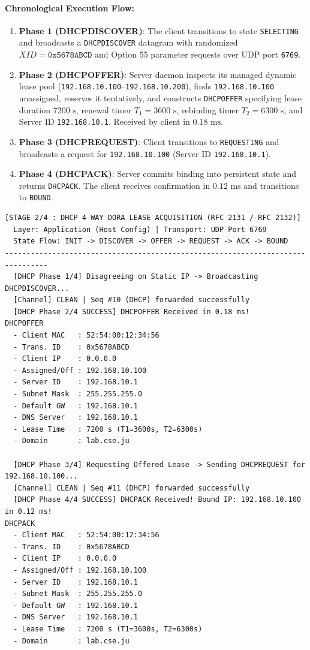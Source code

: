 \documentclass[12pt, a4paper]{article}
\begin{document}
\paragraph{Chronological Execution Flow:}
\begin{enumerate}
    \item \textbf{Phase 1 (DHCPDISCOVER)}: The client transitions to state \texttt{SELECTING} and broadcasts a \texttt{DHCPDISCOVER} datagram with randomized $XID = \texttt{0x5678ABCD}$ and Option 55 parameter requests over UDP port \texttt{6769}.
    \item \textbf{Phase 2 (DHCPOFFER)}: Server daemon inspects its managed dynamic lease pool (\texttt{192.168.10.100}--\texttt{192.168.10.200}), finds \texttt{192.168.10.100} unassigned, reserves it tentatively, and constructs \texttt{DHCPOFFER} specifying lease duration $7200\text{ s}$, renewal timer $T_1 = 3600\text{ s}$, rebinding timer $T_2 = 6300\text{ s}$, and Server ID \texttt{192.168.10.1}. Received by client in $0.18\text{ ms}$.
    \item \textbf{Phase 3 (DHCPREQUEST)}: Client transitions to \texttt{REQUESTING} and broadcasts a request for \texttt{192.168.10.100} (Server ID \texttt{192.168.10.1}).
    \item \textbf{Phase 4 (DHCPACK)}: Server commits binding into persistent state and returns \texttt{DHCPACK}. The client receives confirmation in $0.12\text{ ms}$ and transitions to \texttt{BOUND}.
\end{enumerate}

\begin{lstlisting}[style=termstyle, caption=Authentic Terminal Output: DHCP 4-Way DORA Negotiation Trace]
[STAGE 2/4 : DHCP 4-WAY DORA LEASE ACQUISITION (RFC 2131 / RFC 2132)]
  Layer: Application (Host Config) | Transport: UDP Port 6769
  State Flow: INIT -> DISCOVER -> OFFER -> REQUEST -> ACK -> BOUND
--------------------------------------------------------------------------------
  [DHCP Phase 1/4] Disagreeing on Static IP -> Broadcasting DHCPDISCOVER...
  [Channel] CLEAN | Seq #10 (DHCP) forwarded successfully
  [DHCP Phase 2/4 SUCCESS] DHCPOFFER Received in 0.18 ms!
DHCPOFFER
  - Client MAC   : 52:54:00:12:34:56
  - Trans. ID    : 0x5678ABCD
  - Client IP    : 0.0.0.0
  - Assigned/Off : 192.168.10.100
  - Server ID    : 192.168.10.1
  - Subnet Mask  : 255.255.255.0
  - Default GW   : 192.168.10.1
  - DNS Server   : 192.168.10.1
  - Lease Time   : 7200 s (T1=3600s, T2=6300s)
  - Domain       : lab.cse.ju

  [DHCP Phase 3/4] Requesting Offered Lease -> Sending DHCPREQUEST for 192.168.10.100...
  [Channel] CLEAN | Seq #11 (DHCP) forwarded successfully
  [DHCP Phase 4/4 SUCCESS] DHCPACK Received! Bound IP: 192.168.10.100 in 0.12 ms!
DHCPACK
  - Client MAC   : 52:54:00:12:34:56
  - Trans. ID    : 0x5678ABCD
  - Client IP    : 0.0.0.0
  - Assigned/Off : 192.168.10.100
  - Server ID    : 192.168.10.1
  - Subnet Mask  : 255.255.255.0
  - Default GW   : 192.168.10.1
  - DNS Server   : 192.168.10.1
  - Lease Time   : 7200 s (T1=3600s, T2=6300s)
  - Domain       : lab.cse.ju
\end{lstlisting}
\end{document}
